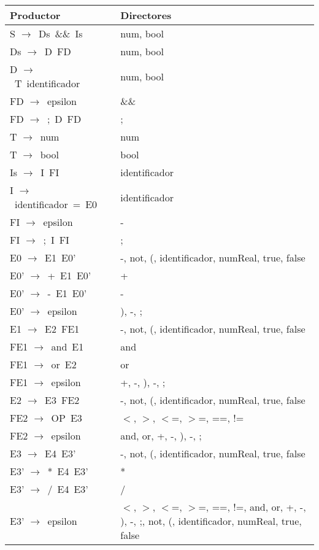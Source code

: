 \begin{tabular}{ |p{5cm}||p{8cm}| }
 \hline
 Productor & Directores \\
 \hline
 S   $\longrightarrow$\ Ds\ \&\&\ Is\ & num, bool \\
 Ds  $\longrightarrow$\ D\ FD\ & num, bool \\
 D   $\longrightarrow$\ T\ identificador\ & num, bool \\
 FD  $\longrightarrow$\ epsilon\ & \&\& \\
 FD  $\longrightarrow$\ ;\ D\ FD\ & ; \\
 T   $\longrightarrow$\ num\ & num \\
 T   $\longrightarrow$\ bool\ & bool \\
 Is  $\longrightarrow$\ I\ FI\ & identificador \\
 I   $\longrightarrow$\ identificador\ =\ E0\ & identificador \\
 FI  $\longrightarrow$\ epsilon\ & - \\
 FI  $\longrightarrow$\ ;\ I\ FI\ & ; \\
 E0  $\longrightarrow$\ E1\ E0'\ & -, not, (, identificador, numReal, true, false \\
 E0' $\longrightarrow$\ +\ E1\ E0'\ & + \\
 E0' $\longrightarrow$\ -\ E1\ E0'\ & - \\
 E0' $\longrightarrow$\ epsilon\ & ), -, ; \\
 E1  $\longrightarrow$\ E2\ FE1\ & -, not, (, identificador, numReal, true, false \\
 FE1 $\longrightarrow$\ and\ E1\ & and \\
 FE1 $\longrightarrow$\ or\ E2\ & or \\
 FE1 $\longrightarrow$\ epsilon\ & +, -, ), -, ; \\
 E2  $\longrightarrow$\ E3\ FE2\ & -, not, (, identificador, numReal, true, false \\
 FE2 $\longrightarrow$\ OP\ E3\ & $<$, $>$, $<$=, $>$=, ==, != \\
 FE2 $\longrightarrow$\ epsilon\ & and, or, +, -, ), -, ; \\
 E3  $\longrightarrow$\ E4\ E3'\ & -, not, (, identificador, numReal, true, false \\
 E3' $\longrightarrow$\ *\ E4\ E3'\ & * \\
 E3' $\longrightarrow$\ /\ E4\ E3'\ & / \\
 E3' $\longrightarrow$\ epsilon\ & $<$, $>$, $<$=, $>$=, ==, !=, and, or, +, -, ), -, ;, not, (, identificador, numReal, true, false \\

\end{tabular}
